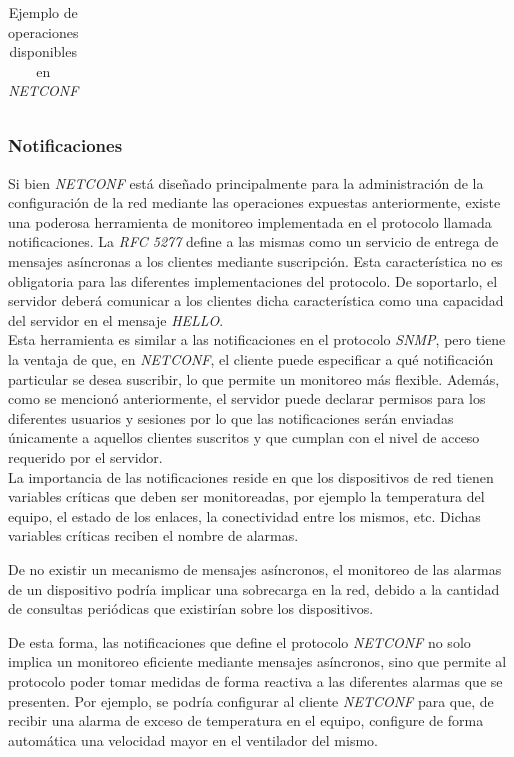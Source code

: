 \begin{table}[H]
\begin{tabular}{|c|c|c|}
	\end{tabular}
	\caption{Ejemplo de operaciones disponibles en \textit{NETCONF}}
	\label{Tab:netconf_operaciones}
	\end{table}


  \subsubsection{Notificaciones}

  Si bien \textit{NETCONF} está diseñado principalmente para la administración de la configuración de la red mediante las operaciones expuestas anteriormente, existe una poderosa herramienta de monitoreo implementada en el protocolo llamada notificaciones. La \textit{RFC 5277} define a las mismas como un servicio de entrega de mensajes asíncronas a los clientes mediante suscripción. Esta característica no es obligatoria para las diferentes implementaciones del protocolo. De soportarlo, el servidor deberá comunicar a los clientes dicha característica como una capacidad del servidor en el mensaje \textit{HELLO}.
  \\

  Esta herramienta es similar a las notificaciones en el protocolo \textit{SNMP}, pero tiene la ventaja de que, en \textit{NETCONF}, el cliente puede especificar a qué notificación particular se desea suscribir, lo que permite un monitoreo más flexible. Además, como se mencionó anteriormente, el servidor puede declarar permisos para los diferentes usuarios y sesiones por lo que las notificaciones serán enviadas únicamente a aquellos clientes suscritos y que cumplan con el nivel de acceso requerido por el servidor.
  \\

  La importancia de las notificaciones reside en que los dispositivos de red tienen variables críticas que deben ser monitoreadas, por ejemplo la temperatura del equipo, el estado de los enlaces, la conectividad entre los mismos, etc. Dichas variables críticas reciben el nombre de alarmas. 
  
  De no existir un mecanismo de mensajes asíncronos, el monitoreo de las alarmas de un dispositivo podría implicar una sobrecarga en la red, debido a la cantidad de consultas periódicas que existirían sobre los dispositivos. 


  De esta forma, las notificaciones que define el protocolo \textit{NETCONF} no solo implica un monitoreo eficiente mediante mensajes asíncronos, sino que permite al protocolo poder tomar medidas de forma reactiva a las diferentes alarmas que se presenten. Por ejemplo, se podría configurar al cliente \textit{NETCONF} para que, de recibir una alarma de exceso de temperatura en el equipo, configure de forma automática una velocidad mayor en el ventilador del mismo. 
  \\

